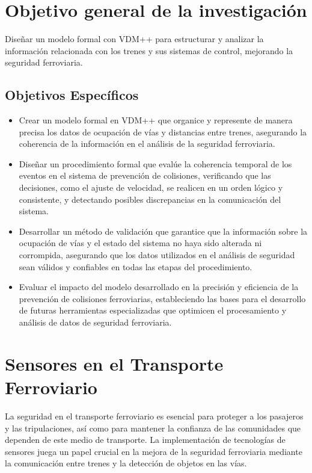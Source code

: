 \documentclass[journal]{IEEEtran}
\begin{document}
\section{Objetivo general de la investigación}  
Diseñar un modelo formal con VDM++ para estructurar y analizar la información relacionada con los trenes y sus sistemas de control, mejorando la seguridad ferroviaria.

\subsection{Objetivos Específicos}  

\begin{itemize}  
    \item Crear un modelo formal en VDM++ que organice y represente de manera precisa los datos de ocupación de vías y distancias entre trenes, asegurando la coherencia de la información en el análisis de la seguridad ferroviaria.  

    \item Diseñar un procedimiento formal que evalúe la coherencia temporal de los eventos en el sistema de prevención de colisiones, verificando que las decisiones, como el ajuste de velocidad, se realicen en un orden lógico y consistente, y detectando posibles discrepancias en la comunicación del sistema.  

    \item Desarrollar un método de validación que garantice que la información sobre la ocupación de vías y el estado del sistema no haya sido alterada ni corrompida, asegurando que los datos utilizados en el análisis de seguridad sean válidos y confiables en todas las etapas del procedimiento.  

    \item Evaluar el impacto del modelo desarrollado en la precisión y eficiencia de la prevención de colisiones ferroviarias, estableciendo las bases para el desarrollo de futuras herramientas especializadas que optimicen el procesamiento y análisis de datos de seguridad ferroviaria.  
\end{itemize}  

\section{Sensores en el Transporte Ferroviario}
La seguridad en el transporte ferroviario es esencial para proteger a los pasajeros y las tripulaciones, así como para mantener la confianza de las comunidades que dependen de este medio de transporte. La implementación de tecnologías de sensores juega un papel crucial en la mejora de la seguridad ferroviaria mediante la comunicación entre trenes y la detección de objetos en las vías.  
\end{document}
